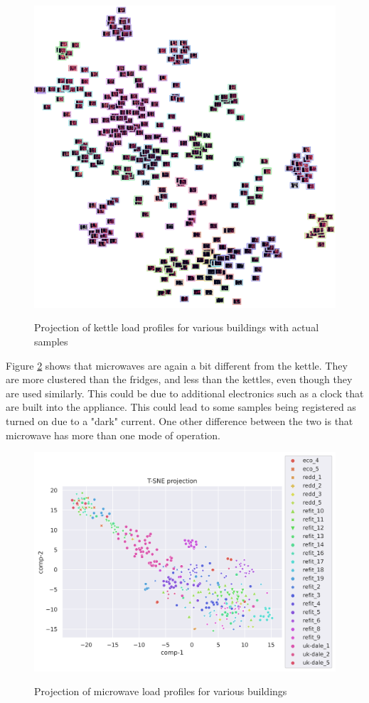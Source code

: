 \begin{figure}[H]
	\centering
	\caption{Projection of kettle load profiles for various buildings with actual samples}
	\includegraphics[width=.9\textwidth]{Figures/TSNE/TSNE_per_appliance/all/img_scatter_allkettle.png}
	\label{fig:tsne_pa_img_scatter_all_kettle}
\end{figure}

Figure \ref{fig:tsne_pa_scatter_all_microwave} shows that microwaves are again a bit different from the kettle.
They are more clustered than the fridges, and less than the kettles, even though they are used similarly.
This could be due to additional electronics such as a clock that are built into
the appliance. This could lead to some samples being registered as turned on due to 
a "dark" current. One other difference between the two is that microwave has more than one mode of operation.

\begin{figure}[H]
	\centering
	\caption{Projection of microwave load profiles for various buildings}
	\includegraphics[width=1.2\textwidth]{Figures/TSNE/TSNE_per_appliance/all/scatter_all_microwave.png}
	\label{fig:tsne_pa_scatter_all_microwave}
\end{figure}

